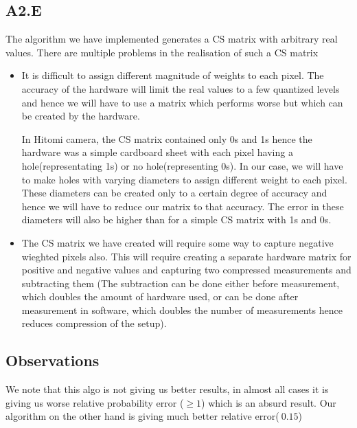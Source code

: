 \documentclass{article}
\begin{document}
\subsection*{A2.E}

The algorithm we have implemented generates a CS matrix with arbitrary real values.
There are multiple problems in the realisation of such a CS matrix

\begin{itemize}
    \item{It is difficult to assign different magnitude of weights to each pixel.
          The accuracy of the hardware will limit the real values to a few quantized 
          levels and hence we will have to use a matrix which performs worse but
          which can be created by the hardware.

        In Hitomi camera, the CS matrix contained only 0s and 1s hence the 
          hardware was a simple cardboard sheet with each pixel having a
          hole(representating 1s) or no hole(representing 0s).
          In our case, we will have to make holes with varying diameters to
          assign different weight to each pixel. These diameters can be created only
          to a certain degree of accuracy and hence we will have to reduce our
          matrix to that accuracy. The error in these diameters will also be higher
          than for a simple CS matrix with 1s and 0s.}


    \item{The CS matrix we have created will require some way to capture negative
    wieghted pixels also. This will require creating a separate hardware matrix
    for positive  and negative values and capturing two compressed measurements
    and subtracting them (The subtraction can be done either before measurement,
    which doubles the amount of hardware used, or can be done after measurement
    in software, which doubles the number of measurements hence reduces
    compression of the setup).}
\end{itemize}


\subsection*{Observations}
We note that this algo is not giving us better results, in almost all cases it is giving us worse relative probability error ($\ge 1$)
 which is an absurd result. Our algorithm on the other hand is giving much better relative error($~0.15$)
\end{document}
